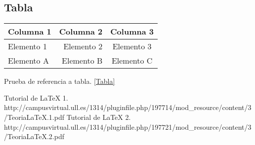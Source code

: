 \documentclass[spanish,a4paper,10pt]{article}
\begin{document}
\subsection{Tabla}
\begin{Tabla}
\begin{tabular}{lrc}
Columna 1 & Columna 2 & Columna 3 \\ \hline
Elemento 1 & Elemento 2 & Elemento 3 \\
Elemento A & Elemento B & Elemento C
\end{tabular}
\end{Tabla}
Prueba de referencia a tabla. \ref{Tabla}

\begin{thebibliography}{1}
 Tutorial de \LaTeX{} 1. http://campusvirtual.ull.es/1314/pluginfile.php/197714/mod_resource/content/3/TeoriaLaTeX.1.pdf
 Tutorial de \LaTeX{} 2. http://campusvirtual.ull.es/1314/pluginfile.php/197721/mod_resource/content/3/TeoriaLaTeX.2.pdf
\end{thebibliography}
\end{document}
